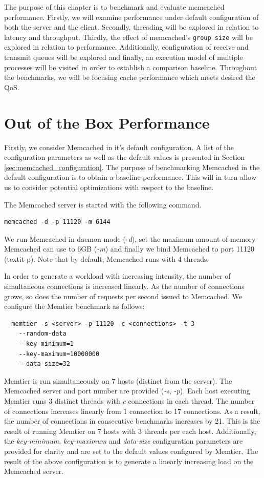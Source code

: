 The purpose of this chapter is to benchmark and evaluate memcached performance. Firstly, we will examine performance under default configuration of both the server and the client. Secondly, threading will be explored in relation to latency and throughput. Thirdly, the effect of memcached's \texttt{group size} will be explored in relation to performance. Additionally, configuration of receive and transmit queues will be explored and finally, an execution model of multiple processes will be visited in order to establish a comparison baseline. Throughout the benchmarks, we will be focusing cache performance which meets desired the QoS.


\section{Out of the Box Performance}

Firstly, we consider Memcached in it's default configuration. A list of the configuration parameters as well as the default values is presented in Section \ref{sec:memcached_configuration}. The purpose of benchmarking Memcached in the default configuration is to obtain a baseline performance. This will in turn allow us to consider potential optimizations with respect to the baseline.

The Memcached server is started with the following command.

\begin{lstlisting}
memcached -d -p 11120 -m 6144
\end{lstlisting}

We run Memcached in daemon mode (\textit{-d}), set the maximum amount of memory Memcached can use to 6GB (\textit{-m}) and finally we bind Memcached to port 11120 (textit{-p}). Note that by default, Memcached runs with 4 threads.


In order to generate a workload with increasing intensity, the number of simultaneous connections is increased linearly. As the number of connections grows, so does the number of requests per second issued to Memcached. We configure the Memtier benchmark as follows:

\begin{lstlisting}
  memtier -s <server> -p 11120 -c <connections> -t 3
    --random-data
    --key-minimum=1
    --key-maximum=10000000
    --data-size=32
\end{lstlisting}
Memtier is run simultaneously on 7 hosts (distinct from the server). The Memcached server and port number are provided (\textit{-s}, \textit{-p}). Each host executing Memtier runs 3 distinct threads with \textit{c} connections in each thread. The number of connections increases linearly from 1 connection to 17 connections. As a result, the number of connections in consecutive benchmarks increases by 21. This is the result of running Memtier on 7 hosts with 3 threads per each host. Additionally, the \textit{key-minimum}, \textit{key-maximum} and \textit{data-size} configuration parameters are provided for clarity and are set to the default values configured by Memtier. The result of the above configuration is to generate a linearly increasing load on the Memcached server.


